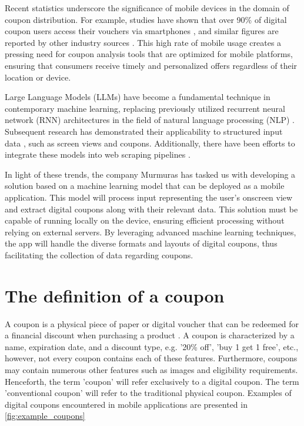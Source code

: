 \documentclass[licencjacka,en]{pracamgr}
\begin{document}
Recent statistics underscore the significance of mobile devices in the domain of coupon distribution. For example, studies have shown that over 90\% of digital coupon users access their vouchers via smartphones \cite{emarketer_coupon_stats}, and similar figures are reported by other industry sources \cite{coupon_stats_2}. This high rate of mobile usage creates a pressing need for coupon analysis tools that are optimized for mobile platforms, ensuring that consumers receive timely and personalized offers regardless of their location or device.

Large Language Models (LLMs) have become a fundamental technique in contemporary machine learning, replacing previously utilized recurrent neural network (RNN) architectures in the field of natural language processing (NLP) \cite{li2024}. Subsequent research has demonstrated their applicability to structured input data \cite{sui2024}, such as screen views and coupons. Additionally, there have been efforts to integrate these models into web scraping pipelines \cite{scapegraph_repo}. 

In light of these trends, the company Murmuras has tasked us with developing a solution based on a machine learning model that can be deployed as a mobile application. This model will process input representing the user's onscreen view and extract digital coupons along with their relevant data. This solution must be capable of running locally on the device, ensuring efficient processing without relying on external servers. By leveraging advanced machine learning techniques, the app will handle the diverse formats and layouts of digital coupons, thus facilitating the collection of data regarding coupons.

\section{The definition of a coupon} 
A coupon is a physical piece of paper or digital voucher that can be redeemed for a financial discount when purchasing a product \cite{coupon_definition}. A coupon is characterized by a name, expiration date, and a discount type, e.g. '20\% off', 'buy 1 get 1 free', etc., however, not every coupon contains each of these features. Furthermore, coupons may contain numerous other features such as images and eligibility requirements. Henceforth, the term 'coupon' will refer exclusively to a digital coupon. The term 'conventional coupon' will refer to the traditional physical coupon. Examples of digital coupons encountered in mobile applications are presented in \ref{fig:example_coupons}
\end{document}
